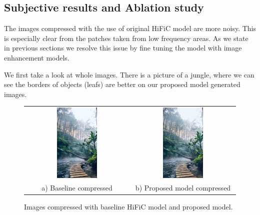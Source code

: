 \subsection{Subjective results and Ablation study}

The images compressed with the use of original HiFiC model are more noisy. This is especially clear from the patches taken from low frequency areas. As we state in previous sections we resolve this issue by fine tuning the model with image enhancement models.

We first take a look at whole images. There is a picture of a jungle, where we can see the borders of objects (leafs) are better on our proposed model generated images.

\begin{figure}[!ht]
    \centering
    \begin{tabular}{cc}
        \includegraphics[width=0.4\textwidth]{figure/jungle-full.png} & \includegraphics[width=0.4\textwidth]{figure/jungle-denoise-full.png} \\
        a) Baseline compressed                                        & b) Proposed model compressed
    \end{tabular}
    \caption{Images compressed with baseline HiFiC model and proposed model.}
    \label{compressed-jungle}
\end{figure}

